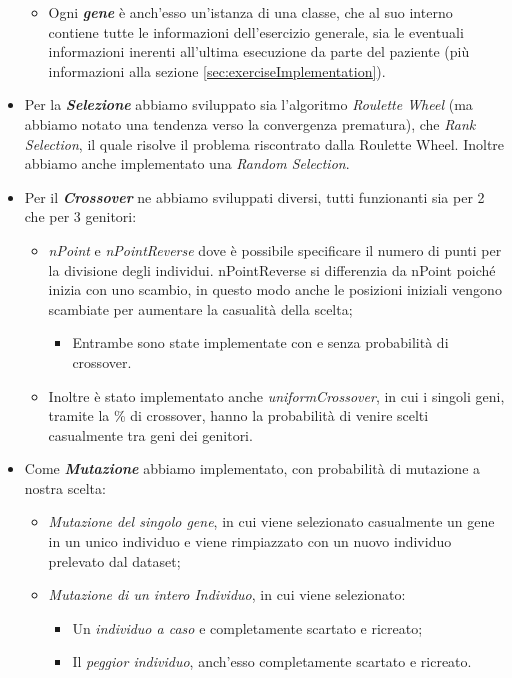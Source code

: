 \documentclass{article}
\begin{document}
\begin{itemize}
\begin{itemize}
\item Ogni \textbf{\textit{gene}} è anch'esso un'istanza di una classe, che al suo interno contiene tutte le informazioni dell'esercizio generale, sia le eventuali informazioni inerenti all'ultima esecuzione da parte del paziente (più informazioni alla sezione \ref{sec:exerciseImplementation}).

\end{itemize}

\item Per la \textbf{\textit{Selezione}} abbiamo sviluppato sia l'algoritmo \textit{Roulette Wheel} (ma abbiamo notato una tendenza verso la convergenza prematura), che \textit{Rank Selection}, il quale risolve il problema riscontrato dalla Roulette Wheel. Inoltre abbiamo anche implementato una \textit{Random Selection}.

\item Per il \textbf{\textit{Crossover}} ne abbiamo sviluppati diversi, tutti funzionanti sia per 2 che per 3 genitori:

\begin{itemize}

\item \textit{nPoint} e \textit{nPointReverse} dove è possibile specificare il numero di punti per la divisione degli individui. nPointReverse si differenzia da nPoint poiché inizia con uno scambio, in questo modo anche le posizioni iniziali vengono scambiate per aumentare la casualità della scelta;
\begin{itemize}
    \item Entrambe sono state implementate con e senza probabilità di crossover.
\end{itemize}
\item Inoltre è stato implementato anche \textit{uniformCrossover}, in cui i singoli geni, tramite la \% di crossover, hanno la probabilità di venire scelti casualmente tra geni dei genitori.

\end{itemize}

\pagebreak

\item Come \textit{\textbf{Mutazione}} abbiamo implementato, con probabilità di mutazione a nostra scelta:
\begin{itemize}
\item \textit{Mutazione del singolo gene}, in cui viene selezionato casualmente un gene in un unico individuo e viene rimpiazzato con un nuovo individuo prelevato dal dataset;
\item \textit{Mutazione di un intero Individuo}, in cui viene selezionato:
    \begin{itemize}
        \item Un \textit{individuo a caso} e completamente scartato e ricreato;
        \item Il \textit{peggior individuo}, anch'esso completamente scartato e ricreato.
    \end{itemize}
\end{itemize}


\end{itemize}
\end{document}
